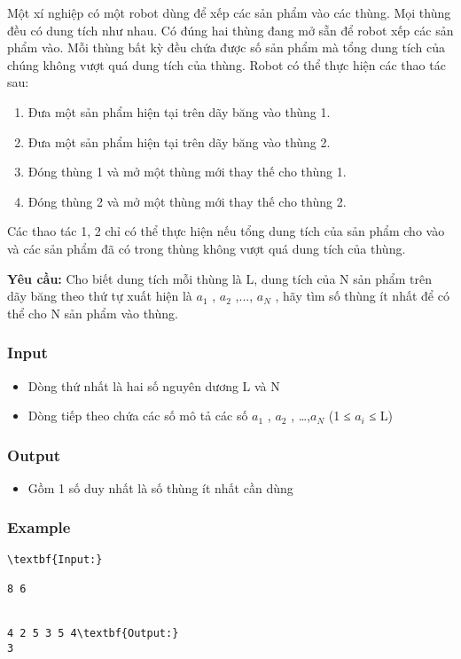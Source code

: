 



   Một xí nghiệp có một robot dùng để xếp các sản phẩm vào các thùng. Mọi thùng đều có dung tích như nhau. Có đúng hai thùng đang mở sẵn để robot xếp các sản phẩm vào. Mỗi thùng bất kỳ đều chứa được số sản phẩm mà tổng dung tích của chúng không vượt quá dung tích của thùng. Robot có thể thực hiện các thao tác sau:  
\begin{enumerate}
	\item     Đưa một sản phẩm hiện tại trên dãy băng vào thùng 1.   
	\item     Đưa một sản phẩm hiện tại trên dãy băng vào thùng 2.   
	\item     Đóng thùng 1 và mở một thùng mới thay thế cho thùng 1.   
	\item     Đóng thùng 2 và mở một thùng mới thay thế cho thùng 2.   
\end{enumerate}

   Các thao tác 1, 2 chỉ có thể thực hiện nếu tổng dung tích của sản phẩm cho vào và các sản phẩm đã có trong thùng không vượt quá dung tích của thùng.  



\textbf{    Yêu cầu:   }   Cho biết dung tích mỗi thùng là L, dung tích của N sản phẩm trên dãy băng theo thứ tự xuất hiện là $a_{1}$   , $a_{2}$   ,..., $a_{N}$   , hãy tìm số thùng ít nhất để có thể cho N sản phẩm vào thùng.  

\subsubsection{   Input  }
\begin{itemize}
	\item     Dòng thứ nhất là hai số nguyên dương L và N   
	\item     Dòng tiếp theo chứa các số mô tả các số $a_{1}$    , $a_{2}$    , …,$a_{N}$    (1 ≤ $a_{i}$    ≤ L)   
\end{itemize}

\subsubsection{   Output  }
\begin{itemize}
	\item     Gồm 1 số duy nhất là số thùng ít nhất cần dùng   
\end{itemize}

\subsubsection{   Example  }
\begin{verbatim}
\textbf{Input:}

8 6


4 2 5 3 5 4\textbf{Output:}
3\end{verbatim}

